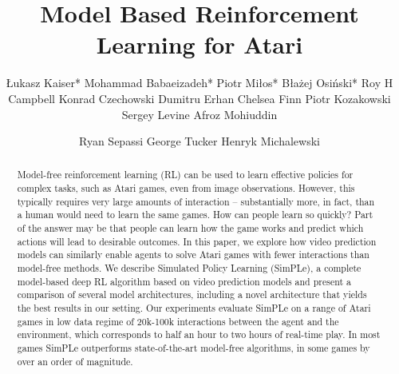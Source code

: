 \documentclass[usletter]{article}
\title{Model Based Reinforcement Learning for Atari}
\author{
 \L{}ukasz Kaiser* \And Mohammad Babaeizadeh* \And  Piotr Mi\l{}os* \And Błażej Osiński*  \And
 Roy H Campbell \And Konrad Czechowski \And Dumitru Erhan \And Chelsea Finn \And Piotr Kozakowski \And Sergey Levine \And Afroz Mohiuddin \and Ryan Sepassi \And  George Tucker \And  Henryk Michalewski
}
\begin{document}
\maketitle
\vspace{-0.5cm}

\begin{abstract}
  Model-free reinforcement learning (RL) can be used to learn effective policies for complex tasks, such as Atari games, even from image observations. However, this typically requires very large amounts of interaction -- substantially more, in fact, than a human would need to learn the same games. How can people learn so quickly? Part of the answer may be that people can learn how the game works and predict which actions will lead to desirable outcomes. In this paper, we explore how video prediction models can similarly enable agents to solve Atari games with fewer interactions than model-free methods. We describe Simulated Policy Learning (SimPLe), a complete model-based deep RL algorithm based on video prediction models and present a comparison of several model architectures, including a novel architecture that yields the best results in our setting. Our experiments evaluate SimPLe on a range of Atari games in low data regime of 20k-100k interactions between the agent and the environment, which corresponds to half an hour to two hours of real-time play. In most games SimPLe outperforms state-of-the-art model-free algorithms, in some games by over an order of magnitude.
\end{abstract}











% 










\end{document}
